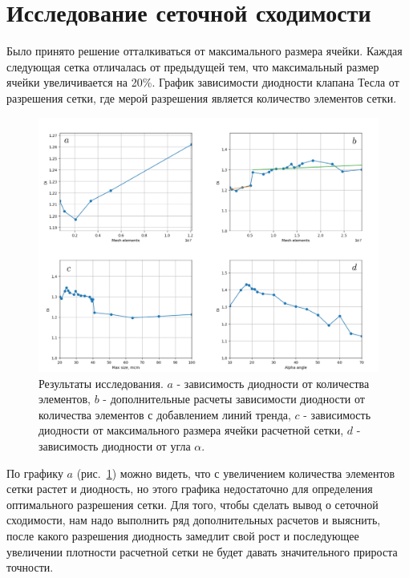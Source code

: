 \documentclass[10pt,a4paper]{book}
\begin{document}
    \section{Исследование сеточной сходимости}
    Было принято решение отталкиваться от максимального размера ячейки. Каждая следующая сетка отличалась от предыдущей тем, что максимальный размер ячейки увеличивается на 20\%. График зависимости диодности клапана Тесла от разрешения сетки, где мерой разрешения является количество элементов сетки.

    \begin{figure}[H]
            \centering
            \includegraphics[width = 1\linewidth]{allGraph}
            \caption{Результаты исследования. $a$ - зависимость диодности от количества элементов, $b$ - дополнительные расчеты зависимости диодности от количества элементов с добавлением линий тренда, $c$ - зависимость диодности от максимального размера ячейки расчетной сетки, $d$ - зависимость диодности от угла $\alpha$.}
            \label{fig:allGraph}
        \end{figure}
    
    По графику $a$ (рис.~\ref{fig:allGraph}) можно видеть, что с увеличением количества элементов сетки растет и диодность, но этого графика недостаточно для определения оптимального разрешения сетки. Для того, чтобы сделать вывод о сеточной сходимости, нам надо выполнить ряд дополнительных расчетов и выяснить, после какого разрешения диодность замедлит свой рост и последующее увеличении плотности расчетной сетки не будет давать значительного прироста точности. 
    
\end{document}
